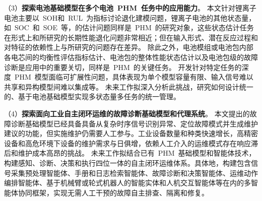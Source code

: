 （3）\textbf{探索电池基础模型在多个电池~PHM~任务中的应用能力}。
% 
本文针对锂离子电池主要以~SOH和~RUL~为指标讨论退化建模问题，锂离子电池的其他状态量，如~SOC~和~SOE~等，的估计问题同样是~PHM~的研究对象，这些状态估计任务在形式上和所研究的长期性能退化问题非常相近；但在输入形式、潜在反应过程和对特征的依赖性上与所研究的问题存在差异。
除此之外，电池模组或电池包内部各电芯间的均衡性评估指标估计、电池包的整体性能状态估计以及电池包级的故障诊断是应用中的重要关切，同样是~PHM~的关键任务。
开发针对特定任务的深度~PHM~模型面临可扩展性问题，具体表现为单个模型容量有限、输入信号难以共享和异构模型间难以集成等。
未来工作拟深入分析此挑战，研究如何设计统一的、基于电池基础模型实现多状态量多任务的统一管理。

（4）\textbf{探索面向工业自主闭环运维的故障诊断基础模型和代理系统}。
% 
本文提出的故障诊断基础模型已经具备具备从复杂时序信号识别异常、定位故障模式并生成维护建议的功能，但实施维护仍需要人工参与。工业设备数量和种类快速增长，高精密设备和高危环境下设备的维护需求与日俱增，依赖人工介入的运维模式存在响应滞后和维护成本高昂的挑战。
未来工作拟结合已有~PHM~基础模型和智能体技术，构建感知、诊断、决策和执行四位一体的自主闭环运维体系。具体地，构建包含信号采集预处理智能体、手册和日志检索智能体、故障诊断和决策智能体、运维动作编排智能体、基于机械臂或轮式机器人的智能实体和人机交互智能体等在内的多智能体协同框架，实现无需人工干预的故障自主排查、隔离和修复。
